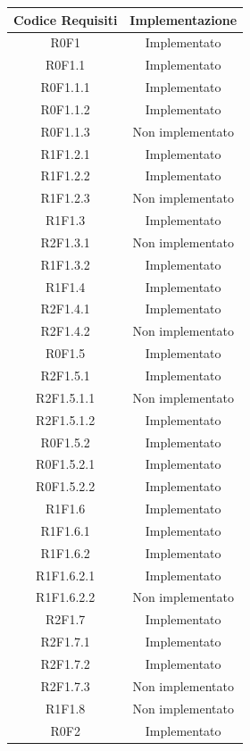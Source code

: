 \normalsize
\begin{longtable}{|c|c|}
	\hline
	\textbf{Codice Requisiti} & \textbf{Implementazione} \\
	\hline
	\endhead
	R0F1 & Implementato\\
	\hline
	R0F1.1  & Implementato\\
	\hline
	R0F1.1.1  & Implementato\\
	\hline
	R0F1.1.2  & Implementato\\
	\hline
	R0F1.1.3 & Non implementato\\
	\hline
	R1F1.2.1 & Implementato\\
	\hline
	R1F1.2.2 & Implementato\\
	\hline
	R1F1.2.3 & Non implementato\\
	\hline
	R1F1.3 & Implementato\\
	\hline
	R2F1.3.1 & Non implementato\\
	\hline
	R1F1.3.2 & Implementato\\
	\hline
	R1F1.4 & Implementato\\
	\hline
	R2F1.4.1 & Implementato\\
	\hline
	R2F1.4.2 & Non implementato\\
	\hline
	R0F1.5 & Implementato\\
	\hline
	R2F1.5.1 & Implementato\\
	\hline
	R2F1.5.1.1 & Non implementato\\
	\hline
	R2F1.5.1.2 & Implementato\\
	\hline
	R0F1.5.2 & Implementato\\
	\hline
	R0F1.5.2.1 & Implementato\\
	\hline
	R0F1.5.2.2 & Implementato\\
	\hline
	R1F1.6 & Implementato\\
	\hline
	R1F1.6.1 & Implementato\\
	\hline
	R1F1.6.2 & Implementato\\
	\hline
	R1F1.6.2.1 & Implementato\\
	\hline
	R1F1.6.2.2 & Non implementato\\
	\hline
	R2F1.7 & Implementato\\
	\hline
	R2F1.7.1 & Implementato\\
	\hline
	R2F1.7.2 & Implementato\\
	\hline
	R2F1.7.3 & Non implementato\\
	\hline
	R1F1.8 & Non implementato\\
	\hline
	R0F2 & Implementato\\

\end{longtable}
